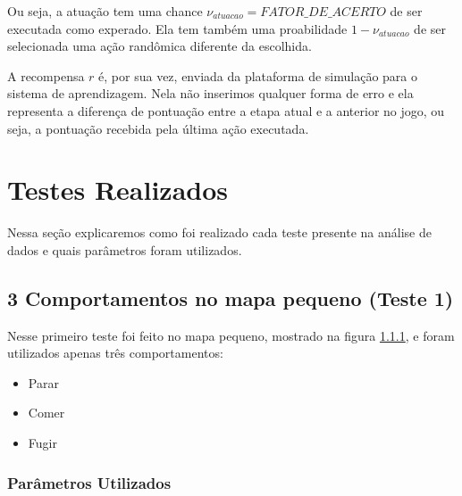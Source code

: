 Ou seja, a atuação tem uma chance $ \nu_{atuacao} = \textit{FATOR\_DE\_ACERTO} $ de ser executada como experado. Ela tem também uma proabilidade $ 1 - \nu_{atuacao} $ de ser selecionada uma ação randômica diferente da escolhida.

A recompensa $ r $ é, por sua vez, enviada da plataforma de simulação para o sistema de aprendizagem. Nela não inserimos qualquer forma de erro e ela representa a diferença de pontuação entre a etapa atual e a anterior no jogo, ou seja, a pontuação recebida pela última ação executada.


\section{Testes Realizados} \label{section:TestesRealizados}

Nessa seção explicaremos como foi realizado cada teste presente na análise de dados e quais parâmetros foram utilizados.

\subsection{3 Comportamentos no mapa pequeno (Teste 1)} \label{subsection:3ComportamentosMapaPequeno}

Nesse primeiro teste foi feito no mapa pequeno, mostrado na figura \ref{}, e foram utilizados apenas três comportamentos:

\begin{itemize}
	\item Parar
	\item Comer
	\item Fugir
\end{itemize}

\subsubsection{Parâmetros Utilizados}

